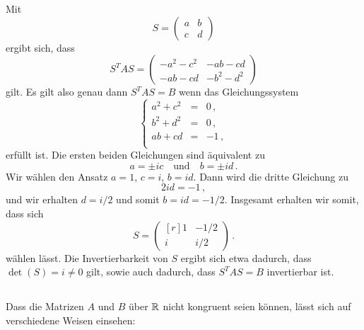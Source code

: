 \section{}





\subsection{}

Mit
\[
    S
  = \begin{pmatrix}
      a & b \\
      c & d
    \end{pmatrix}
\]
ergibt sich, dass
\[
    S^T A S
  = \begin{pmatrix}
      - a^2 - c^2 & -ab - cd    \\
      - ab - cd   & - b^2 - d^2
    \end{pmatrix}
\]
gilt.
Es gilt also genau dann $S^T A S = B$ wenn das Gleichungssystem
\[
  \left\{
    \begin{array}{rcr}
      a^2 + c^2 &=&  0 \,,  \\
      b^2 + d^2 &=&  0 \,,  \\
      ab + cd   &=& -1 \,,  \\
    \end{array}
  \right.
\]
erfüllt ist.
Die ersten beiden Gleichungen sind äquivalent zu
\[
  a = \pm i c
  \quad\text{und}\quad
  b = \pm i d \,.
\]
Wir wählen den Ansatz $a = 1$, $c = i$, $b = id$.
Dann wird die dritte Gleichung zu
\[
  2id = -1 \,,
\]
und wir erhalten $d = i/2$ und somit $b = id = -1/2$.
Insgesamt erhalten wir somit, dass sich
\[
    S
  = \begin{pmatrix*}[r]
      1 & -1/2  \\
      i &  i/2
    \end{pmatrix*} \,.
\]
wählen lässt.
Die Invertierbarkeit von $S$ ergibt sich etwa dadurch, dass $\det(S) =  i \neq 0$ gilt, sowie auch dadurch, dass $S^T A S = B$ invertierbar ist.





\subsection{}

Dass die Matrizen $A$ und $B$ über $\mathbb{R}$ nicht kongruent seien können, lässt sich auf verschiedene Weisen einsehen:

